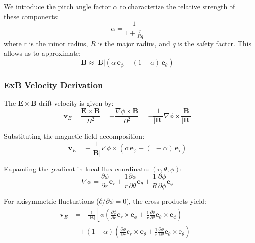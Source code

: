 \documentclass[11pt,a4paper]{article}
\begin{document}
We introduce the pitch angle factor $\alpha$ to characterize the relative strength of these components:
\begin{equation}
\alpha = \frac{1}{1 + \frac{r}{Rq}}
\end{equation}
where $r$ is the minor radius, $R$ is the major radius, and $q$ is the safety factor. This allows us to approximate:
\begin{equation}
\mathbf{B} \approx |\mathbf{B}| \left( \alpha \, \mathbf{e}_\phi + (1 - \alpha) \, \mathbf{e}_\theta \right)
\end{equation}

\subsubsection{ExB Velocity Derivation}

The $\mathbf{E} \times \mathbf{B}$ drift velocity is given by:
\begin{equation}
\mathbf{v}_E = \frac{\mathbf{E} \times \mathbf{B}}{B^2} = -\frac{\nabla \phi \times \mathbf{B}}{B^2} = -\frac{1}{|\mathbf{B}|} \nabla \phi \times \frac{\mathbf{B}}{|\mathbf{B}|}
\end{equation}

Substituting the magnetic field decomposition:
\begin{equation}
\mathbf{v}_E = -\frac{1}{|\mathbf{B}|} \nabla \phi \times \left( \alpha \, \mathbf{e}_\phi + (1 - \alpha) \, \mathbf{e}_\theta \right)
\end{equation}

Expanding the gradient in local flux coordinates $(r, \theta, \phi)$:
\begin{equation}
\nabla \phi = \frac{\partial \phi}{\partial r} \mathbf{e}_r + \frac{1}{r} \frac{\partial \phi}{\partial \theta} \mathbf{e}_\theta + \frac{1}{R} \frac{\partial \phi}{\partial \phi} \mathbf{e}_\phi
\end{equation}

For axisymmetric fluctuations ($\partial/\partial \phi = 0$), the cross products yield:
\begin{align}
\mathbf{v}_E &= -\frac{1}{|\mathbf{B}|} \left[ \alpha \left( \frac{\partial \phi}{\partial r} \mathbf{e}_r \times \mathbf{e}_\phi + \frac{1}{r} \frac{\partial \phi}{\partial \theta} \mathbf{e}_\theta \times \mathbf{e}_\phi \right) \right. \nonumber \\
&\quad \left. + (1 - \alpha) \left( \frac{\partial \phi}{\partial r} \mathbf{e}_r \times \mathbf{e}_\theta + \frac{1}{r} \frac{\partial \phi}{\partial \theta} \mathbf{e}_\theta \times \mathbf{e}_\theta \right) \right]
\end{align}
\end{document}
